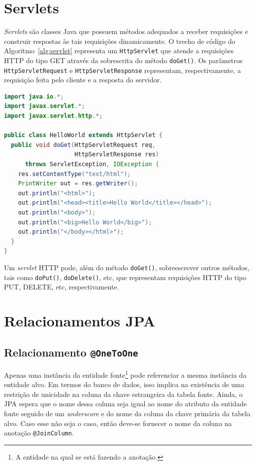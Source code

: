 \documentclass[
  10.5pt,				  %
	openright,			%
	twoside,			  %
  a5paper,
  chapter=TITLE,	%
	section=TITLE,	%
  hyphens,        %
	english,        %
	brazil          %
]{abntex2}
\begin{document}
\anexos

\chapter{Servlets}\label{anexo:servlets}

\emph{Servlets} são classes Java que possuem métodos adequados a receber requisições e construir respostas às tais requisições dinamicamente. O trecho de código do Algoritmo~\ref{alg:servlet} representa um \texttt{HttpServlet} que atende a requisições HTTP do tipo GET através da sobrescrita do método \texttt{doGet()}. Os parâmetros \texttt{HttpServletRequest} e \texttt{HttpServletResponse} representam, respectivamente, a requisição feita pelo cliente e a resposta do servidor.
%
\begin{lstlisting}[language=Java, caption={Um \emph{servlet} que imprime ``\emph{Hello World}''.}, label={alg:servlet}]
import java.io.*;
import javax.servlet.*;
import javax.servlet.http.*;

public class HelloWorld extends HttpServlet {
  public void doGet(HttpServletRequest req,
                    HttpServletResponse res)
      throws ServletException, IOException {
    res.setContentType("text/html");
    PrintWriter out = res.getWriter();
    out.println("<html>");
    out.println("<head><title>Hello World</title></head>");
    out.println("<body>");
    out.println("<big>Hello World</big>");
    out.println("</body></html>");
  }
}
\end{lstlisting}

Um \emph{servlet} HTTP pode, além do método \texttt{doGet()}, sobreescrever outros métodos, tais como \texttt{doPut()}, \texttt{doDelete()}, etc, que representam requisições HTTP do tipo PUT, DELETE, etc, respectivamente.



\chapter{Relacionamentos JPA}\label{anexo:jpa}


\section{Relacionamento \texttt{@OneToOne}}
Apenas uma instância da entidade fonte\footnote{A entidade na qual se está fazendo a anotação.} pode referenciar a mesma instância da entidade alvo. Em termos do banco de dados, isso implica na existência de uma restrição de unicidade na coluna da chave estrangeira da tabela fonte. Ainda, o JPA espera que o nome dessa coluna seja igual ao nome do atributo da entidade fonte seguido de um \emph{underscore} e do nome da coluna da chave primária da tabela alvo. Caso esse não seja o caso, então deve-se fornecer o nome da coluna na anotação \texttt{@JoinColumn}.
\end{document}
